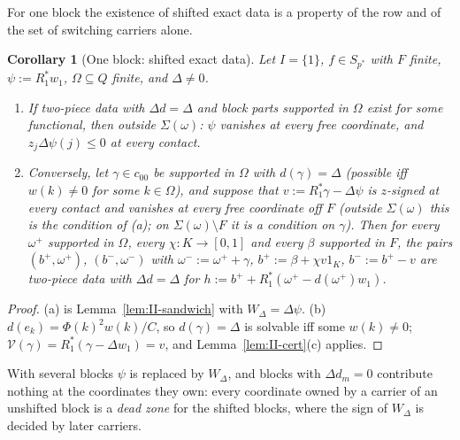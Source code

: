 \documentclass[10pt]{amsart}
\newtheorem{corollary}[theorem]{Corollary}
\theoremstyle{definition}
\theoremstyle{remark}
\begin{document}
For one block the existence of shifted exact data is a property of the row
and of the set of switching carriers alone.

\begin{corollary}[One block: shifted exact data]\label{cor:II-A}
Let $I=\{1\}$, $f\in S_{p^*}$ with $F$ finite, $\psi:=R_1^*w_1$, $\Omega\subseteq
Q$ finite, and $\Delta\ne0$.
\begin{enumerate}
\item[(a)] If two-piece data with $\Delta d=\Delta$ and block parts supported
in $\Omega$ exist for some functional, then outside $\Sigma(\omega)$: $\psi$
vanishes at every free coordinate, and $z_j\Delta\psi(j)\le0$ at every
contact.
\item[(b)] Conversely, let $\gamma\in c_{00}$ be supported in $\Omega$ with
$d(\gamma)=\Delta$ \textup{(}possible iff $w(k)\ne0$ for some $k\in\Omega$\textup{)},
and suppose that $v:=R_1^*\gamma-\Delta\psi$ is $z$-signed at every contact
and vanishes at every free coordinate off $F$ \textup{(}outside
$\Sigma(\omega)$ this is the condition of \textup{(a)}; on $\Sigma(\omega)\setminus
F$ it is a condition on $\gamma$\textup{)}.  Then for every $\omega^+$
supported in $\Omega$, every $\chi:K\to[0,1]$ and every $\beta$ supported in
$F$, the pairs $(b^+,\omega^+)$, $(b^-,\omega^-)$ with $\omega^-:=\omega^++\gamma$,
$b^+:=\beta+\chi v1_K$, $b^-:=b^+-v$ are two-piece data with $\Delta d=\Delta$
for $h:=b^++R_1^*(\omega^+-d(\omega^+)w_1)$.
\end{enumerate}
\end{corollary}

\begin{proof}
(a) is Lemma~\ref{lem:II-sandwich} with $W_\Delta=\Delta\psi$.  (b) $d(e_k)=
\Phi(k)^2w(k)/C$, so $d(\gamma)=\Delta$ is solvable iff some $w(k)\ne0$;
$\mathcal V(\gamma)=R_1^*(\gamma-\Delta w_1)=v$, and Lemma~\ref{lem:II-cert}(c)
applies.
\end{proof}

With several blocks $\psi$ is replaced by $W_\Delta$, and blocks with
$\Delta d_m=0$ contribute nothing at the coordinates they own: every
coordinate owned by a carrier of an unshifted block is a \emph{dead zone}
for the shifted blocks, where the sign of $W_\Delta$ is decided by later
carriers.
\end{document}
